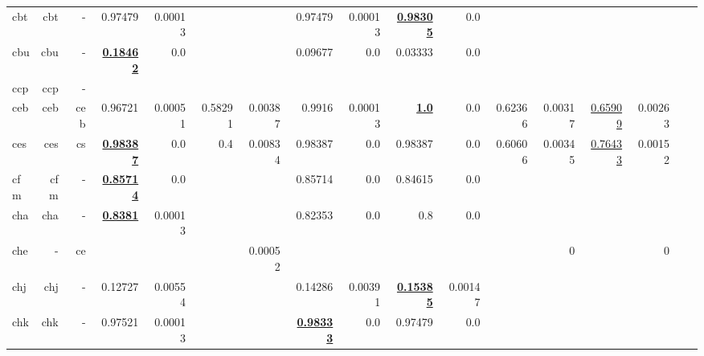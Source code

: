 \documentclass[11pt]{article}
\begin{document}
\begin{table*}[h]
{\begin{tabular}{lrrrrrrrrrrrrrrrr}
cbt         & cbt         & -         & 0.97479         & 0.00013         &          &          & 0.97479         & 0.00013         & \textbf{\underline{0.98305}}         & 0.0         &          &          &          &          \\
cbu         & cbu         & -         & \textbf{\underline{0.18462}}         & 0.0         &          &          & 0.09677         & 0.0         & 0.03333         & 0.0         &          &          &          &          \\
ccp         & ccp         & -         &          &          &          &          &          &          &          &          &          &          &          &          \\
ceb         & ceb         & ceb         & 0.96721         & 0.00051         & 0.58291         & 0.00387         & 0.9916         & 0.00013         & \textbf{\underline{1.0}}         & 0.0         & 0.62366         & 0.00317         & \underline{0.65909}         & 0.00263         \\
ces         & ces         & cs         & \textbf{\underline{0.98387}}         & 0.0         & 0.4         & 0.00834         & 0.98387         & 0.0         & 0.98387         & 0.0         & 0.60606         & 0.00345         & \underline{0.76433}         & 0.00152         \\
cfm         & cfm         & -         & \textbf{\underline{0.85714}}         & 0.0         &          &          & 0.85714         & 0.0         & 0.84615         & 0.0         &          &          &          &          \\
cha         & cha         & -         & \textbf{\underline{0.8381}}         & 0.00013         &          &          & 0.82353         & 0.0         & 0.8         & 0.0         &          &          &          &          \\
che         & -         & ce         &          &          &          & 0.00052         &          &          &          &          &          & 0         &          & 0         \\
chj         & chj         & -         & 0.12727         & 0.00554         &          &          & 0.14286         & 0.00391         & \textbf{\underline{0.15385}}         & 0.00147         &          &          &          &          \\
chk         & chk         & -         & 0.97521         & 0.00013         &          &          & \textbf{\underline{0.98333}}         & 0.0         & 0.97479         & 0.0         &          &          &          &          \\

\end{tabular}}
\end{table*}
\end{document}
